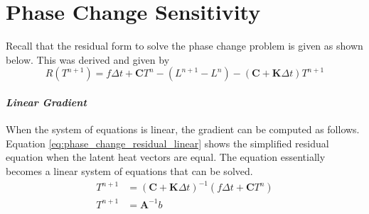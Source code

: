 \chapter{Phase Change Sensitivity}
\label{appendix:B}

Recall that the residual form to solve the phase change problem is given as shown below. This was derived and given by \cite{Nallathambi_Specht_Bertram_2009}
\begin{equation*}
    R(T^{n+1}) = f\Delta t + \mathbf{C}T^n - (L^{n+1} - L^n) - (\mathbf{C} + \mathbf{K}\Delta t)T^{n+1}
    \label{eq:phase_change_residual}
  \end{equation*}
  
  \subsubsection*{\emph{Linear Gradient}}
  When the system of equations is linear, the gradient can be computed as follows. Equation \ref{eq:phase_change_residual_linear} shows the simplified residual equation when the latent heat vectors are equal. The equation essentially becomes a linear system of equations that can be solved.
  \begin{equation}
    \begin{split}
      T^{n+1} &= (\mathbf{C}+\mathbf{K}\Delta t)^{-1}(f\Delta t + \mathbf{C}T^n) \\
      T^{n+1} &= \mathbf{A}^{-1}b    
    \end{split}
    \label{eq:phase_change_residual_linear}
  \end{equation} 
  
